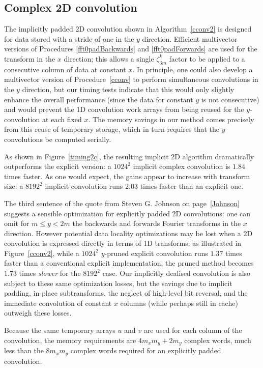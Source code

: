 \documentclass[final]{siamltex}
\begin{document}
\subsection{Complex 2D convolution}
The implicitly padded 2D convolution shown in Algorithm~\ref{cconv2} 
is designed for data stored with a stride of one in the $y$
direction. Efficient multivector versions of Procedures \ref{fft0padBackwards}
and \ref{fft0padForwards} are used for the transform in the $x$ direction;
this allows a single $\zeta_{3m}^k$ factor to be applied to a consecutive
column of data at constant $x$. In principle, one could also develop a
multivector version of Procedure~\ref{cconv} to perform simultaneous
convolutions in the $y$ direction, but our timing tests indicate that this
would only slightly enhance the overall performance (since the data for constant
$y$ is not consecutive) and would prevent the 1D convolution
work arrays from being reused for the $y$-convolution at each fixed $x$. The
memory savings in our method comes precisely from this reuse of temporary
storage, which in turn requires that the $y$ convolutions be computed
serially.

As shown in Figure~\ref{timing2c}, the resulting implicit
2D algorithm dramatically outperforms the explicit version:
a $1024^2$ implicit complex convolution is $1.84$ times faster.
As one would expect, the gains appear to increase with transform size: a
$8192^2$ implicit convolution runs $2.03$ times faster than an explicit one. 

The third sentence of the quote from Steven G. Johnson on
page~\ref{Johnson} suggests a sensible optimization for
explicitly padded 2D convolutions: one can omit for $m \le y < 2m$
the backwards and forwards Fourier transforms in the $x$ direction.
However potential data locality optimizations may be lost
when a 2D convolution is expressed directly in terms of 1D transforms: as
illustrated in Figure~\ref{cconv2}, while a $1024^2$ $y$-pruned explicit
convolution runs $1.37$ times faster than a conventional explicit
implementation, the pruned method becomes $1.73$ times {\it slower} for the
$8192^2$ case. Our implicitly dealised convolution is also subject
to these same optimization losses, but the savings due to implicit padding,
in-place subtransforms, the neglect of high-level bit reversal, and the
immediate convolution of constant $x$ columns (while perhaps still in
cache) outweigh these losses.

Because the same temporary arrays $u$ and $v$ are used for each column
of the convolution, the memory requirements are $4m_xm_y+2m_y$ complex
words, much less than the $8m_xm_y$ complex words required for an
explicitly padded convolution.
\end{document}
